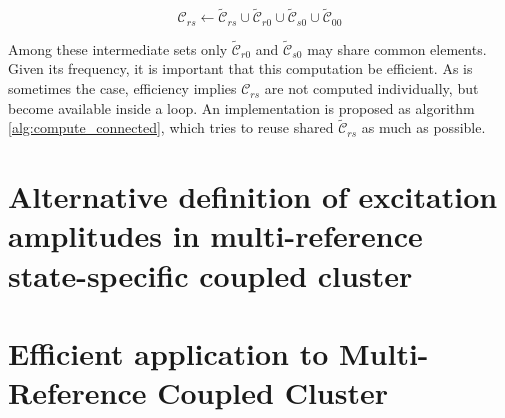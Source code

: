 \documentclass[./thesis.tex]{subfiles}
\begin{document}
\begin{equation}
\mathcal{C}_{rs} \gets \tilde{\mathcal{C}}_{rs} \cup \tilde{\mathcal{C}}_{r0} \cup \tilde{\mathcal{C}}_{s0} \cup \tilde{\mathcal{C}}_{00}
\end{equation}

Among these intermediate sets only $\tilde{\mathcal{C}}_{r0}$ and $\tilde{\mathcal{C}}_{s0}$ may share common elements. Given its frequency, it is important that this computation be efficient. As is sometimes the case, efficiency implies $\mathcal{C}_{rs}$ are not computed individually, but become available inside a loop. An implementation is proposed as algorithm \ref{alg:compute_connected}, which tries to reuse shared $\tilde{\mathcal{C}}_{rs}$ as much as possible.



\section{Alternative definition of excitation amplitudes in multi-reference state-specific coupled cluster}\cite{Garniron_2017}


\section{Efficient application to Multi-Reference Coupled Cluster}

\newcommand{\interC}[1]{\tilde{\mathcal{C}}_{#1}}
\newcommand{\finC}[1]{\mathcal{C}_{#1}}
\end{document}
